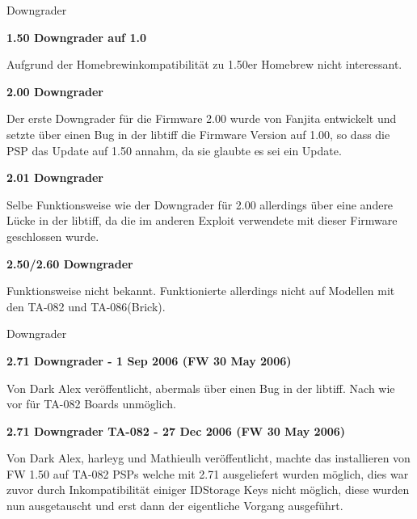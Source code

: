 \documentclass[mode=print,paper=screen,style=jefka]{powerdot}
\begin{document}
\begin{slide}{Downgrader}
	\begin{large}\textbf{1.50 Downgrader auf 1.0}\end{large}\linebreak
	Aufgrund der Homebrewinkompatibilität zu 1.50er Homebrew nicht interessant.\linebreak
	\linebreak
	\begin{large}\textbf{2.00 Downgrader}\end{large}\linebreak
	Der erste Downgrader für die Firmware 2.00 wurde von Fanjita entwickelt und setzte über einen Bug in der libtiff die
	Firmware Version auf 1.00, so dass die PSP das Update auf 1.50 annahm, da sie glaubte es sei ein Update.\linebreak
	\linebreak
	\begin{large}\textbf{2.01 Downgrader}\end{large}\linebreak
	Selbe Funktionsweise wie der Downgrader für 2.00 allerdings über eine andere Lücke in der libtiff, da die im anderen
	Exploit verwendete mit dieser Firmware geschlossen wurde.\linebreak
	\linebreak
	\begin{large}\textbf{2.50/2.60 Downgrader}\end{large}\linebreak
	Funktionsweise nicht bekannt. Funktionierte allerdings nicht auf Modellen mit den TA-082 und TA-086(Brick).
\end{slide}

\begin{slide}{Downgrader}
	\begin{large}\textbf{2.71 Downgrader - 1 Sep 2006 (FW 30 May 2006)}\end{large}\linebreak
	Von Dark Alex veröffentlicht, abermals über einen Bug in der libtiff. Nach wie vor für TA-082 Boards unmöglich.\linebreak
	\linebreak
	\begin{large}\textbf{2.71 Downgrader TA-082 - 27 Dec 2006 (FW 30 May 2006)}\end{large}\linebreak
	Von Dark Alex, harleyg und Mathieulh veröffentlicht, machte das installieren von FW 1.50 auf TA-082 PSPs welche mit
	2.71 ausgeliefert wurden möglich, dies war zuvor durch Inkompatibilität einiger IDStorage Keys nicht möglich, diese
	wurden nun ausgetauscht und erst dann der eigentliche Vorgang ausgeführt.
\end{slide}
\end{document}
